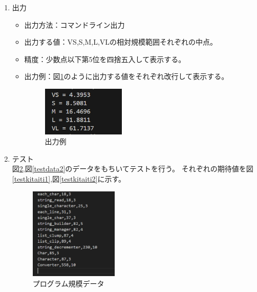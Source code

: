 \documentclass[titlepage,a4paper,12pt]{ltjsreport}
\begin{document}
\begin{enumerate}
\begin{itemize}
        \item 実行時の入力：コマンドラインに以下の形式で入力
        　java プログラム名 実数値入力ファイル名
        \item 実行時入力例：java Program3 data\_program4\_1.csv\\
                

    \end{itemize}


    \item 出力\mbox{}\\
    \begin{itemize}
        \item 出力方法：コマンドライン出力
        \item 出力する値：VS,S,M,L,VLの相対規模範囲それぞれの中点。
        \item 精度：少数点以下第5位を四捨五入して表示する。
        \item 出力例：図\ref{kitaiti1}のように出力する値をそれぞれ改行して表示する。
        
        \begin{figure}[H]
            \centering
            \includegraphics[width=0.4\textwidth]{../picture/課題4/kitaiti1.png}
            \caption{出力例}
            \label{kitaiti1}
        \end{figure}

    \end{itemize}


    \item テスト\mbox{}\\
    図\ref{testdata1},図\ref{testdata2}のデータをもちいてテストを行う。
    それぞれの期待値を図\ref{testkitaiti1},図\ref{testkitaiti2}に示す。\\

    \begin{figure}[H]
        \centering
        \includegraphics[width=0.4\textwidth]{../picture/課題4/4data1.png}
        \caption{プログラム規模データ}
        \label{testdata1}
    \end{figure}


\end{enumerate}
\end{document}
